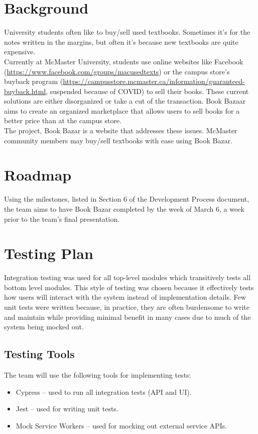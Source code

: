 \documentclass[fullpage]{article}
\newcommand{\bi}{\begin{itemize}}
\newcommand{\ei}{\end{itemize}}
\begin{document}
\section{Background}
\label{sec:background}
University students often like to buy/sell used textbooks. Sometimes it's for the notes written in the margins, but often it's because new textbooks are quite expensive.\\
Currently at McMaster University, students use online websites like Facebook (\url{https://www.facebook.com/groups/macusedtexts}) or the campus store's buyback program (\url{https://campusstore.mcmaster.ca/information/guaranteed-buyback.html}, suspended because of COVID) to sell their books. These current solutions are either disorganized or take a cut of the transaction. Book Bazaar aims to create an organized marketplace that allows users to sell books for a better price than at the campus store.\\
The project, Book Bazar is a website that addresses these issues. McMaster community members may buy/sell textbooks with ease using Book Bazar.
\section{Roadmap}
\label{sec: roadmap}
Using the milestones, listed in Section 6 of the Development Process document, the team aims to have Book Bazar completed by the week of March 6, a week prior to the team's f\textbf{}inal presentation.

\section{Testing Plan}
Integration testing was used for all top-level modules which transitively tests all bottom level modules. This style of testing was chosen because it effectively tests how users will interact with the system instead of implementation details. Few unit tests were written because, in practice, they are often burdensome to write and maintain while providing minimal benefit in many cases due to much of the system being mocked out.

\subsection{Testing Tools}
The team will use the following tools for implementing tests:\\
\bi
    \item Cypress -- used to run all integration tests (API and UI).
    \item Jest -- used for writing unit tests.
    \item Mock Service Workers -- used for mocking out external service APIs.
\ei
\end{document}
